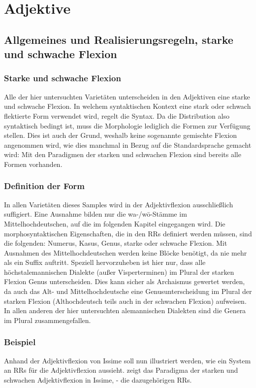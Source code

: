 \section{Adjektive}\label{5.2}

\subsection{Allgemeines und Realisierungsregeln, starke und schwache Flexion}\label{5.2.1}

\subsubsection{Starke und schwache Flexion} Alle der hier untersuchten Varietäten unterscheiden in den Adjektiven eine starke und schwache Flexion. In welchem syntaktischen Kontext eine stark oder schwach flektierte Form verwendet wird, regelt die Syntax. Da die Distribution also syntaktisch bedingt ist, muss die Morphologie lediglich die Formen zur Verfügung stellen. Dies ist auch der Grund, weshalb keine sogenannte gemischte Flexion angenommen wird, wie dies manchmal in Bezug auf die Standardsprache gemacht wird: Mit den Paradigmen der starken und schwachen Flexion sind bereits alle Formen vorhanden.

\subsubsection{Definition der Form} In allen Varietäten dieses Samples wird in der Adjektivflexion ausschließlich suffigiert. Eine Ausnahme bilden nur die wa-/w\=o-Stäm\-me im Mittelhochdeutschen, auf die im folgenden Kapitel eingegangen wird. Die morphosyntaktischen Eigenschaften, die in den RRs definiert werden müssen, sind die folgenden: Numerus, Kasus, Genus, starke oder schwache Flexion. Mit Ausnahmen des Mittelhochdeutschen werden keine Blöcke benötigt, da nie mehr als ein Suffix auftritt. Speziell hervorzuheben ist hier nur, dass alle höchstalemannischen Dialekte (außer Visperterminen) im Plural der starken Flexion Genus unterscheiden. Dies kann sicher als Archaismus gewertet werden, da auch das Alt- und Mittelhochdeutsche eine Genusunterscheidung im Plural der starken Flexion (Althochdeutsch teils auch in der schwachen Flexion) aufweisen. In allen anderen der hier untersuchten alemannischen Dialekten sind die Genera im Plural zusammengefallen.

\subsubsection{Beispiel} Anhand der Adjektivflexion von Issime soll nun illustriert werden, wie ein System an RRs für die Adjektivflexion aussieht.  zeigt das Paradigma der starken und schwachen Adjektivflexion in Issime, - die dazugehörigen RRs. 

